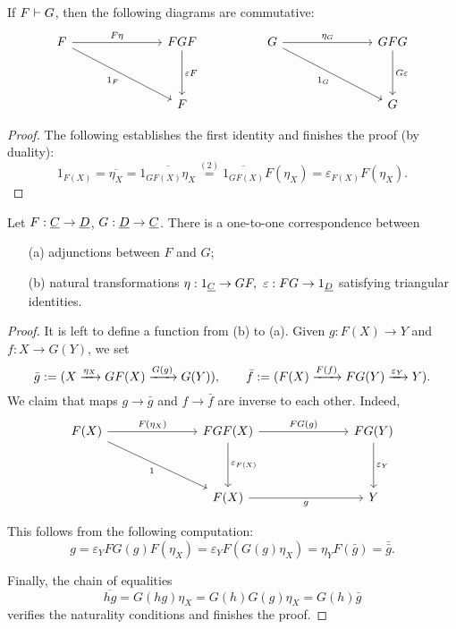 \begin{lemma*}
	If \( F \mathrel{\vdash} G \), then the following diagrams are commutative:
	\[
		\begin{tikzcd}
			F &&& FGF && G &&& GFG \\
			\\
			&&& F &&&&& G
			\arrow["{F\eta}", from=1-1, to=1-4]
			\arrow["{1_F}"', from=1-1, to=3-4]
			\arrow["{\varepsilon F}", from=1-4, to=3-4]
			\arrow["{\eta_G}", from=1-6, to=1-9]
			\arrow["{1_G}"', from=1-6, to=3-9]
			\arrow["{G\varepsilon}", from=1-9, to=3-9]
		\end{tikzcd}
	\]
\end{lemma*}
\begin{proof}
	The following establishes the first identity and finishes the proof (by duality):
	\[
		1_{F(X)} = \overline{\eta_X} = \overline{1_{GF(X)} \eta_X} \overset{(2)}{=} \overline{1_{GF(X)}} F(\eta_X) = \varepsilon_{F(X)} F(\eta_X).
	\]
\end{proof}

\begin{theorem*}
	Let \( F: \underline{C} \to \underline{D} \), \( G: \underline{D} \to \underline{C} \). There is a one-to-one correspondence between
	\begin{itemize}
		\item[(a)] adjunctions between \( F \) and \( G \);
		\item[(b)] natural transformations \( \eta: 1_{\underline{C}} \to GF,~ \varepsilon: FG \to 1_{\underline{D}} \) satisfying triangular identities.
	\end{itemize}
\end{theorem*}
\begin{proof}
	It is left to define a function from (b) to (a). Given \( g: F(X) \to Y \) and \( f: X \to G(Y) \), we set
	\[
		\bar{g} := (X \xrightarrow{\eta_X} GF(X) \xrightarrow{G(g)} G(Y)),
		\qquad
		\bar{f} := (F(X) \xrightarrow{F(f)} FG(Y) \xrightarrow{\varepsilon_Y} Y).
	\]
	We claim that maps \( g \to \bar{g} \) and \( f \to \bar{f} \) are inverse to each other. Indeed,
	\[
		\begin{tikzcd}{F(X)} &&& {FGF(X)} &&& {FG(Y)} \\
			\\
			&&& {F(X)} &&& Y
			\arrow["{F(\eta_X)}", from=1-1, to=1-4]
			\arrow["1"', from=1-1, to=3-4]
			\arrow["{FG(g)}", from=1-4, to=1-7]
			\arrow["{\varepsilon_{F(X)}}", from=1-4, to=3-4]
			\arrow["{\varepsilon_Y}", from=1-7, to=3-7]
			\arrow["g"', from=3-4, to=3-7]
		\end{tikzcd}
	\]

	This follows from the following computation:
	\[
		g = \varepsilon_Y FG(g) F(\eta_X) = \varepsilon_Y F(G(g) \eta_X) = \eta_Y F(\bar{g}) = \bar{\bar{g}}.
	\]

	Finally, the chain of equalities
	\[
		\overline{hg} = G(hg) \eta_X = G(h) G(g) \eta_X = G(h) \bar{g}
	\]
	verifies the naturality conditions and finishes the proof.
\end{proof}

